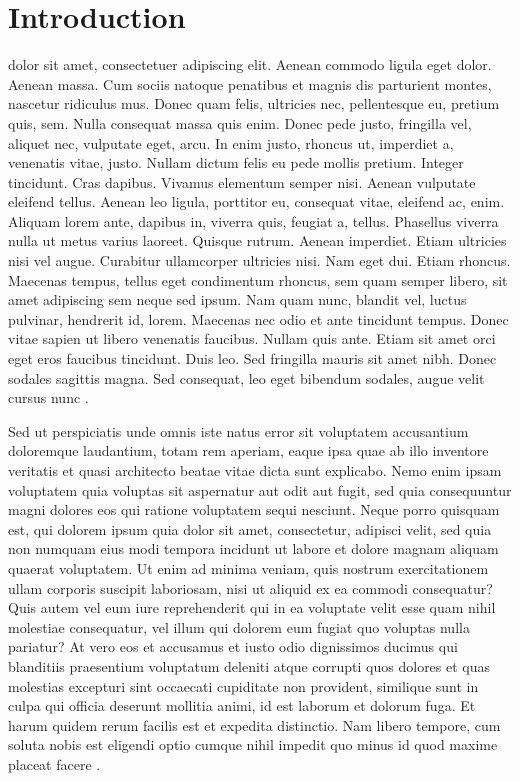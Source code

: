 \chapter{Introduction}

 dolor sit amet, consectetuer adipiscing elit. Aenean commodo ligula 
eget dolor. Aenean massa. Cum sociis natoque penatibus et magnis dis parturient 
montes, nascetur ridiculus mus. Donec quam felis, ultricies nec, pellentesque 
eu, pretium quis, sem. Nulla consequat massa quis enim. Donec pede justo, 
fringilla vel, aliquet nec, vulputate eget, arcu. In enim justo, rhoncus ut, 
imperdiet a, venenatis vitae, justo. Nullam dictum felis eu pede mollis pretium. 
Integer tincidunt. Cras dapibus. Vivamus elementum semper nisi. Aenean vulputate 
eleifend tellus. Aenean leo ligula, porttitor eu, consequat vitae, eleifend ac, 
enim. Aliquam lorem ante, dapibus in, viverra quis, feugiat a, tellus. Phasellus 
viverra nulla ut metus varius laoreet. Quisque rutrum. Aenean imperdiet. Etiam 
ultricies nisi vel augue. Curabitur ullamcorper ultricies nisi. Nam eget dui. 
Etiam rhoncus. Maecenas tempus, tellus eget condimentum rhoncus, sem quam semper 
libero, sit amet adipiscing sem neque sed ipsum. Nam quam nunc, blandit vel, 
luctus pulvinar, hendrerit id, lorem. Maecenas nec odio et ante tincidunt 
tempus. Donec vitae sapien ut libero venenatis faucibus. Nullam quis ante. Etiam 
sit amet orci eget eros faucibus tincidunt. Duis leo. Sed fringilla mauris sit 
amet nibh. Donec sodales sagittis magna. Sed consequat, leo eget bibendum 
sodales, augue velit cursus nunc \cite{GrzegDein03:HFM,Brueckner09:TE3}.

Sed ut perspiciatis unde omnis iste natus error sit voluptatem accusantium 
doloremque laudantium, totam rem aperiam, eaque ipsa quae ab illo inventore 
veritatis et quasi architecto beatae vitae dicta sunt explicabo. Nemo enim ipsam 
voluptatem quia voluptas sit aspernatur aut odit aut fugit, sed quia 
consequuntur magni dolores eos qui ratione voluptatem sequi nesciunt. Neque 
porro quisquam est, qui dolorem ipsum quia dolor sit amet, consectetur, adipisci 
velit, sed quia non numquam eius modi tempora incidunt ut labore et dolore 
magnam aliquam quaerat voluptatem. Ut enim ad minima veniam, quis nostrum 
exercitationem ullam corporis suscipit laboriosam, nisi ut aliquid ex ea commodi 
consequatur? Quis autem vel eum iure reprehenderit qui in ea voluptate velit 
esse quam nihil molestiae consequatur, vel illum qui dolorem eum fugiat quo 
voluptas nulla pariatur? At vero eos et accusamus et iusto odio dignissimos 
ducimus qui blanditiis praesentium voluptatum deleniti atque corrupti quos 
dolores et quas molestias excepturi sint occaecati cupiditate non provident, 
similique sunt in culpa qui officia deserunt mollitia animi, id est laborum et 
dolorum fuga. Et harum quidem rerum facilis est et expedita distinctio. Nam 
libero tempore, cum soluta nobis est eligendi optio cumque nihil impedit quo 
minus id quod maxime placeat facere \cite{Deinzer06:AOO}.


